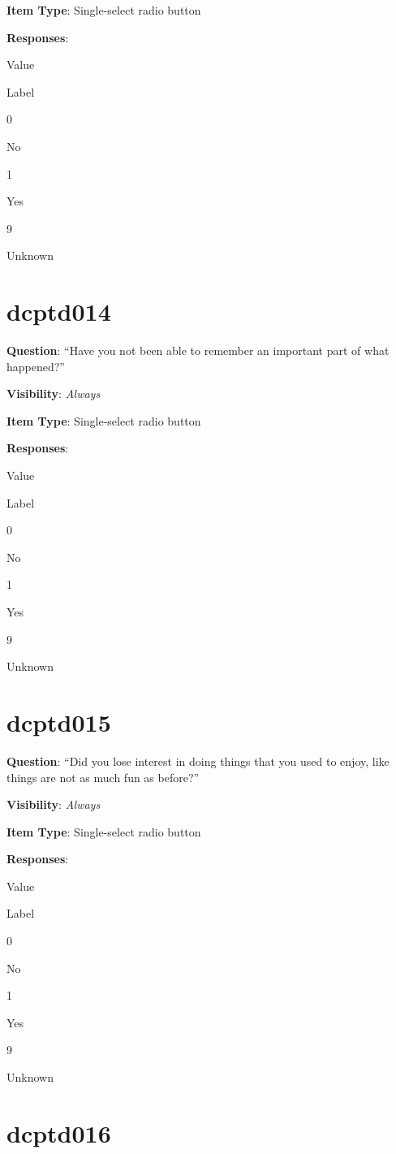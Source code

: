 \documentclass[]{book}
\begin{document}
\textbf{Item Type}: Single-select radio button

\textbf{Responses}:

Value

Label

0

No

1

Yes

9

Unknown

\hypertarget{dcptd014}{%
\section{dcptd014}\label{dcptd014}}

\textbf{Question}: ``Have you not been able to remember an important part of what happened?''

\textbf{Visibility}: \emph{Always}

\textbf{Item Type}: Single-select radio button

\textbf{Responses}:

Value

Label

0

No

1

Yes

9

Unknown

\hypertarget{dcptd015}{%
\section{dcptd015}\label{dcptd015}}

\textbf{Question}: ``Did you lose interest in doing things that you used to enjoy, like things are not as much fun as before?''

\textbf{Visibility}: \emph{Always}

\textbf{Item Type}: Single-select radio button

\textbf{Responses}:

Value

Label

0

No

1

Yes

9

Unknown

\hypertarget{dcptd016}{%
\section{dcptd016}\label{dcptd016}}
\end{document}
